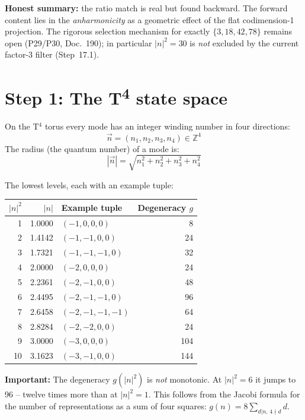 \textbf{Honest summary:} the ratio match is real but found backward. The
forward content lies in the \emph{anharmonicity} as a geometric effect of the
flat codimension-1 projection. The rigorous selection mechanism for exactly
$\{3,18,42,78\}$ remains open (P29/P30, Doc.~190); in particular $|n|^2=30$ is
\emph{not} excluded by the current factor-3 filter (Step~17.1).

\section{Step 1: The T\textsuperscript{4} state space}

On the T$^4$ torus every mode has an integer winding number in
four directions:
\[
  \vec{n} = (n_1, n_2, n_3, n_4) \in \mathbb{Z}^4
\]
The radius (the quantum number) of a mode is:
\[
  |\vec{n}| = \sqrt{n_1^2 + n_2^2 + n_3^2 + n_4^2}
\]

The lowest levels, each with an example tuple:

\begin{center}
\begin{tabular}{rrlr}
\toprule
$|n|^2$ & $|n|$ & Example tuple & Degeneracy $g$ \\
\midrule
1 & 1{.}0000 & $(-1,0,0,0)$ & 8 \\
2 & 1{.}4142 & $(-1,-1,0,0)$ & 24 \\
3 & 1{.}7321 & $(-1,-1,-1,0)$ & 32 \\
4 & 2{.}0000 & $(-2,0,0,0)$ & 24 \\
5 & 2{.}2361 & $(-2,-1,0,0)$ & 48 \\
6 & 2{.}4495 & $(-2,-1,-1,0)$ & 96 \\
7 & 2{.}6458 & $(-2,-1,-1,-1)$ & 64 \\
8 & 2{.}8284 & $(-2,-2,0,0)$ & 24 \\
9 & 3{.}0000 & $(-3,0,0,0)$ & 104 \\
10 & 3{.}1623 & $(-3,-1,0,0)$ & 144 \\
\bottomrule
\end{tabular}
\end{center}

\textbf{Important:} The degeneracy $g(|n|^2)$ is \emph{not} monotonic.
At $|n|^2 = 6$ it jumps to 96 -- twelve times more than at $|n|^2 = 1$.
This follows from the Jacobi formula for the number of representations as
a sum of four squares: $g(n) = 8 \sum_{d | n,\, 4\nmid d} d$.

